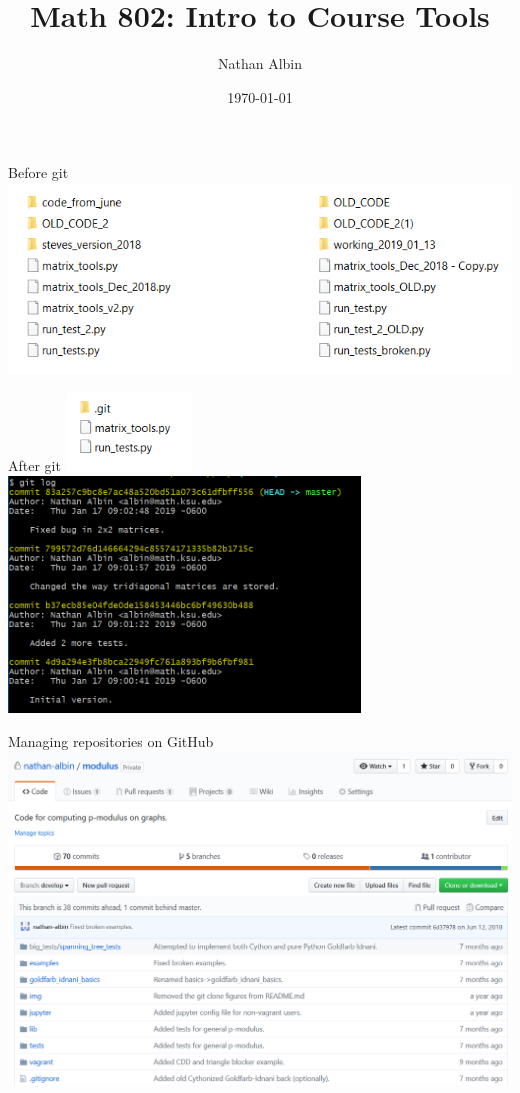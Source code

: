 \documentclass{beamer}
\title{Math 802: Intro to Course Tools}
\author{Nathan Albin}
\date{\today}
\begin{document}
\frame{\titlepage} 

\begin{frame}{Before git}
\includegraphics[width=\textwidth]{images/folder_pre_git.png}
\end{frame}

\begin{frame}{After git}
\includegraphics[width=0.25\textwidth,valign=t]{images/folder_post_git.png}%
\includegraphics[width=0.7\textwidth,valign=t]{images/git_log.png}
\end{frame}

\begin{frame}{Managing repositories on GitHub}
\includegraphics[width=\textwidth]{images/github.png}
\end{frame}
\end{document}
